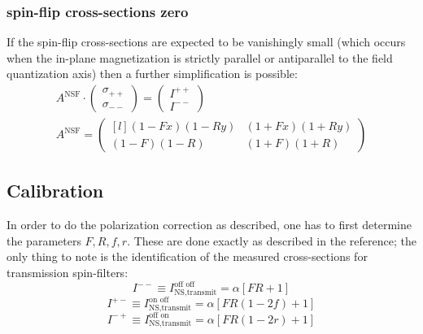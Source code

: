 \documentclass[12pt,letterpaper]{article}
\begin{document}
\subsubsection{spin-flip cross-sections zero}

If the spin-flip cross-sections are expected to be vanishingly small 
(which occurs when the in-plane magnetization is strictly parallel or antiparallel to
the field quantization axis) then a further simplification is possible:
\begin{equation}
\begin{array}{c}
	A^\textrm{NSF} \cdot 
	\begin{pmatrix}
	 	\sigma_{++} \\
	 	\sigma_{--} 
	 \end{pmatrix}	 
	 = 
	 \begin{pmatrix}
		I^{++} \\
		I^{--} 
	\end{pmatrix}  \\[2em]

  A^\textrm{NSF} = 
  \begin{pmatrix*}[l]
	(1-Fx)(1-Ry) &\!\!\!  (1+Fx)(1+Ry) \\
	(1-F)(1-R) &\!\!\! (1+F)(1+R) 
  \end{pmatrix*}
\end{array}
\end{equation}

\subsection{Calibration}
In order to do the polarization correction as described, one has to first determine the parameters
$F,R,f,r$.  These are done exactly as described in the reference; the only thing to note is the 
identification of the measured cross-sections for transmission spin-filters:  
\begin{equation}
I^{--} \equiv I^\textrm{off off}_\textrm{NS,transmit} = \alpha[FR + 1]
\end{equation}
\begin{equation}
I^{+-} \equiv I^\textrm{on off}_\textrm{NS,transmit} = \alpha[FR(1-2f) + 1]
\end{equation}
\begin{equation}
I^{-+} \equiv I^\textrm{off on}_\textrm{NS,transmit} = \alpha[FR(1-2r) + 1]
\end{equation}
\end{document}
